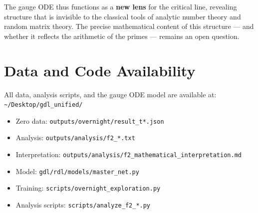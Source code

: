 \documentclass[11pt,a4paper]{article}
\begin{document}
The gauge ODE thus functions as a \textbf{new lens} for the critical line,
revealing structure that is invisible to the classical tools of
analytic number theory and random matrix theory.
The precise mathematical content of this structure --- and whether it reflects
the arithmetic of the primes --- remains an open question.

\section*{Data and Code Availability}

All data, analysis scripts, and the gauge ODE model are available at:\\
\texttt{\textasciitilde/Desktop/gdl\_unified/}

\begin{itemize}
  \item Zero data: \texttt{outputs/overnight/result\_t*.json}
  \item Analysis: \texttt{outputs/analysis/f2\_*.txt}
  \item Interpretation: \texttt{outputs/analysis/f2\_mathematical\_interpretation.md}
  \item Model: \texttt{gdl/rdl/models/master\_net.py}
  \item Training: \texttt{scripts/overnight\_exploration.py}
  \item Analysis scripts: \texttt{scripts/analyze\_f2\_*.py}
\end{itemize}
\end{document}
